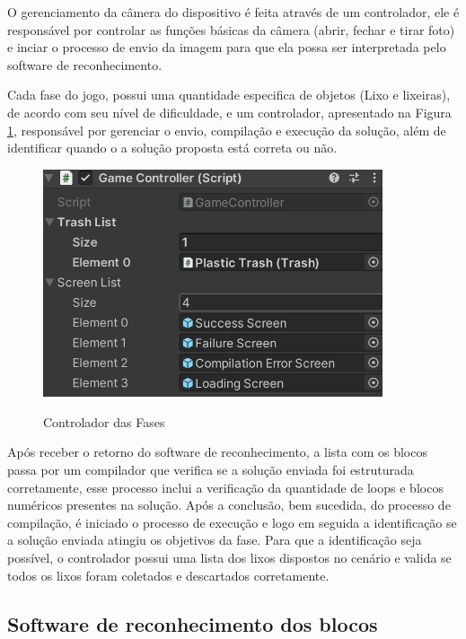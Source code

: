     O gerenciamento da câmera do dispositivo é feita através de um controlador, ele é responsável por controlar as funções básicas da câmera (abrir, fechar e tirar foto) e inciar o processo de envio da imagem para que ela possa ser interpretada pelo software de reconhecimento.
    
    Cada fase do jogo, possui uma quantidade especifica de objetos (Lixo e lixeiras), de acordo com seu nível de dificuldade, e um controlador, apresentado na Figura \ref{figura:controlador_fases}, responsável por gerenciar o envio, compilação e execução da solução, além de identificar quando o a solução proposta está correta ou não. 
    
    \begin{figure}[H]
        \caption{Controlador das Fases}
        \centering
        \includegraphics[width=10cm]{Imagens/Cap4/controlador_fases.png}
        \label{figura:controlador_fases}
    \end{figure}
    
    Após receber o retorno do software de reconhecimento, a lista com os blocos passa por um compilador que verifica se a solução enviada foi estruturada corretamente, esse processo inclui a verificação da quantidade de loops e blocos numéricos presentes na solução. Após a conclusão, bem sucedida, do processo de compilação, é iniciado o processo de execução e logo em seguida a identificação se a solução enviada atingiu os objetivos da fase. Para que a identificação seja possível, o controlador possui uma lista dos lixos dispostos no cenário e valida se todos os lixos foram coletados e descartados corretamente.
    
    
    \subsection{Software de reconhecimento dos blocos}
    
